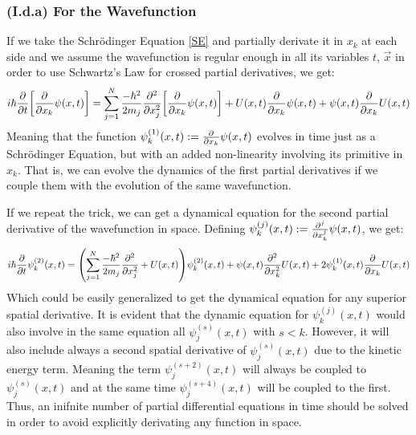 \documentclass[11pt, a4paper]{article} %
\begin{document}
\subsubsection*{(I.d.a) For the Wavefunction}
\vspace{-0.2cm}
If we take the Schrödinger Equation \eqref{SE} and partially derivate it in $x_k$ at each side and we assume the wavefunction is regular enough in all its variables $t$, $\vec{x}$ in order to use Schwartz's Law for crossed partial derivatives, we get:
\begin{equation}
i\hbar \pdv{}{t}\qty[\pdv{}{x_k}\psi(x,t)] = \sum_{j=1}^N\frac{-\hbar^2}{2m_j}\pdv[2]{}{x_j}\qty[\pdv{}{x_k}\psi(x,t)]+U(x,t)\pdv{}{x_k}\psi(x,t) + \psi(x,t)\pdv{}{x_k}U(x,t)
\end{equation}
Meaning that the function $\psi^{(1)}_k(x,t):=\pdv{}{x_k}\psi(x,t)$ evolves in time just as a Schrödinger Equation, but with an added non-linearity involving its primitive in $x_k$. That is, we can evolve the dynamics of the first partial derivatives if we couple them with the evolution of the same wavefunction.

If we repeat the trick, we can get a dynamical equation for the second partial derivative of the wavefunction in space.
Defining $\psi^{(j)}_k(x,t):=\pdv[j]{}{x_k}\psi(x,t)$, we get:
\begin{equation}
i\hbar \pdv{}{t}\psi^{(2)}_k(x,t) = \qty(\sum_{j=1}^N\frac{-\hbar^2}{2m_j}\pdv[2]{}{x_j}+U(x,t))\psi^{(2)}_k(x,t)+ \psi(x,t)\pdv[2]{}{x_k}U(x,t)+2\psi^{(1)}_k(x,t)\pdv{}{x_k}U(x,t)
\end{equation}
Which could be easily generalized to get the dynamical equation for any superior spatial derivative. It is evident that the dynamic equation for $\psi^{(j)}_k(x,t)$ would also involve in the same equation all $\psi^{(s)}_j(x,t)$ with $s<k$. However, it will also include always a second spatial derivative of $\psi^{(s)}_j(x,t)$ due to the kinetic energy term. Meaning the term $\psi^{(s+2)}_j(x,t)$ will always be coupled to $\psi^{(s)}_j(x,t)$ and at the same time $\psi^{(s+4)}_j(x,t)$ will be coupled to the first. Thus, an inifnite number of partial differential equations in time should be solved in order to avoid explicitly derivating any function in space. 
\end{document}
